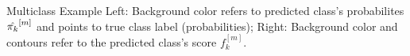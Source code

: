 \begin{frame}{Multiclass Example}
	Left: Background color refers to predicted class's probabilites $\hat{\pi_{k}}^{[m]}$ and points to true class label (probabilities);  
	Right: Background color and contours refer to the predicted class's score $f_k^{[m]}$. 
	
	
\end{frame}
